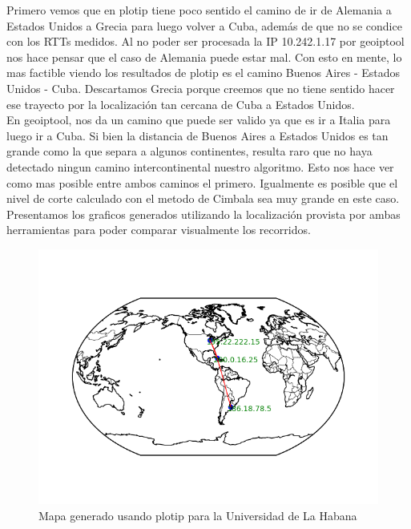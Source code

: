Primero vemos que en plotip tiene poco sentido el camino de ir de Alemania a Estados Unidos a Grecia para luego volver a Cuba, adem\'as de que no se condice con los RTTs medidos. Al no poder ser procesada la IP 10.242.1.17 por geoiptool nos hace pensar que el caso de Alemania puede estar mal. Con esto en mente, lo mas factible viendo los resultados de plotip es el camino Buenos Aires - Estados Unidos - Cuba. Descartamos Grecia porque creemos que no tiene sentido hacer ese trayecto por la localizaci\'on tan cercana de Cuba a Estados Unidos.\\

En geoiptool, nos da un camino que puede ser valido ya que es ir a Italia para luego ir a Cuba. Si bien la distancia de Buenos Aires a Estados Unidos es tan grande como la que separa a algunos continentes, resulta raro que no haya detectado ningun camino intercontinental nuestro algoritmo. Esto nos hace ver como mas posible entre ambos caminos el primero. Igualmente es posible que el nivel de corte calculado con el metodo de Cimbala sea muy grande en este caso.\\

Presentamos los graficos generados utilizando la localizaci\'on provista por ambas herramientas para poder comparar visualmente los recorridos.

\begin{figure}
	\centering
 	\includegraphics[scale=0.8]{imagenes/mapa_cuba_2.png}
 	\caption{Mapa generado usando plotip para la Universidad de La Habana}
\end{figure} 

